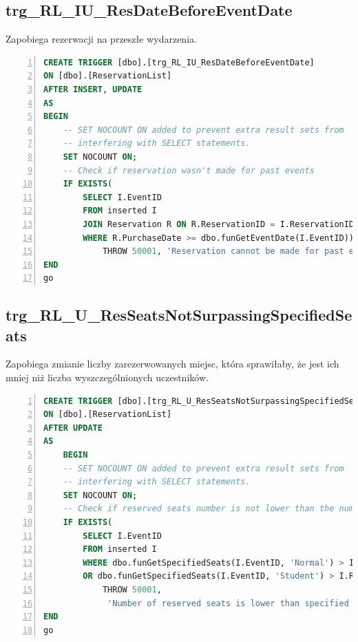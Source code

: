 \documentclass[]{article}
\begin{document}
	\subsection{trg\_RL\_IU\_ResDateBeforeEventDate}
Zapobiega rezerwacji na przeszłe wydarzenia.
\begin{lstlisting}[language=SQL,
showspaces=false,
basicstyle=\ttfamily,
numbers=left,
numberstyle=\tiny,
tabsize=2,
backgroundcolor=\color{lightg},
keywordstyle=\color{lightblue},
commentstyle=\color{gray}]
CREATE TRIGGER [dbo].[trg_RL_IU_ResDateBeforeEventDate]
ON [dbo].[ReservationList]
AFTER INSERT, UPDATE
AS
BEGIN
	-- SET NOCOUNT ON added to prevent extra result sets from
	-- interfering with SELECT statements.
	SET NOCOUNT ON;
	-- Check if reservation wasn't made for past events
	IF EXISTS(
		SELECT I.EventID
		FROM inserted I
		JOIN Reservation R ON R.ReservationID = I.ReservationID
		WHERE R.PurchaseDate >= dbo.funGetEventDate(I.EventID))
			THROW 50001, 'Reservation cannot be made for past events.', 1
END
go
\end{lstlisting}

	\subsection{trg\_RL\_U\_ResSeatsNotSurpassingSpecifiedSeats}
Zapobiega zmianie liczby zarezerwowanych miejsc, która sprawiłaby, że jest ich mniej niż liczba wyszczególnionych uczestników.
\begin{lstlisting}[language=SQL,
showspaces=false,
basicstyle=\ttfamily,
numbers=left,
numberstyle=\tiny,
tabsize=2,
backgroundcolor=\color{lightg},
keywordstyle=\color{lightblue},
commentstyle=\color{gray}]
CREATE TRIGGER [dbo].[trg_RL_U_ResSeatsNotSurpassingSpecifiedSeats]
ON [dbo].[ReservationList]
AFTER UPDATE
AS
	BEGIN
	-- SET NOCOUNT ON added to prevent extra result sets from
	-- interfering with SELECT statements.
	SET NOCOUNT ON;
	-- Check if reserved seats number is not lower than the number of already specified seats
	IF EXISTS(
		SELECT I.EventID
		FROM inserted I
		WHERE dbo.funGetSpecifiedSeats(I.EventID, 'Normal') > I.ReservedNormalSeats
		OR dbo.funGetSpecifiedSeats(I.EventID, 'Student') > I.ReservedStudentSeats)
			THROW 50001,
			 'Number of reserved seats is lower than specified participants.', 1
END
go
\end{lstlisting}
\end{document}
